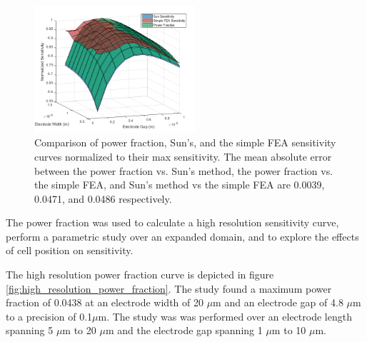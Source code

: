 \begin{figure}[h]
    \centering
    \includegraphics[width=0.53\textwidth]{images/normalizedSensitivityComp.png}
    \caption{Comparison of power fraction, Sun's, and the simple FEA sensitivity curves normalized to their max sensitivity. The mean absolute error between the power fraction vs. Sun's method, the power fraction vs. the simple FEA, and Sun's method vs the simple FEA are 0.0039, 0.0471, and 0.0486 respectively.}
    \label{fig:sun-simple-powerFrac-comp}
\end{figure}

\newpage

\par The power fraction was used to calculate a high resolution sensitivity curve, perform a parametric study over an expanded domain, and to explore the effects of cell position on sensitivity. 

\par The high resolution power fraction curve is depicted in figure \ref{fig:high_resolution_power_fraction}. The study found a maximum power fraction of 0.0438 at an electrode width of 20 $\mu$m and an electrode gap of 4.8 $\mu$m to a precision of 0.1$\mu$m. The study was was performed over an electrode length spanning 5 $\mu$m to 20 $\mu$m and the electrode gap spanning 1 $\mu$m to 10 $\mu$m. 


